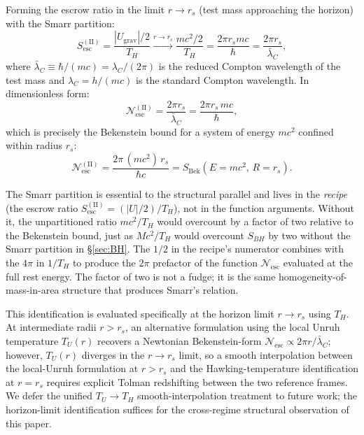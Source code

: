 \documentclass[11pt]{article}
\begin{document}
Forming the escrow ratio in the limit $r \to r_s$ (test mass approaching the horizon) with the Smarr partition:
\begin{equation}
S_{\mathrm{esc}}^{\mathrm{(II)}} = \frac{|U_{\mathrm{grav}}|/2}{T_H} \xrightarrow{r \to r_s} \frac{mc^2/2}{T_H} = \frac{2\pi r_s mc}{\hbar} = \frac{2\pi r_s}{\bar{\lambda}_C},
\label{eq:Sesc_II}
\end{equation}
where $\bar{\lambda}_C \equiv \hbar/(mc) = \lambda_C/(2\pi)$ is the reduced Compton wavelength of the test mass and $\lambda_C = h/(mc)$ is the standard Compton wavelength. In dimensionless form:
\begin{equation}
\mathcal{N}_{\mathrm{esc}}^{\mathrm{(II)}} = \frac{2\pi r_s}{\bar{\lambda}_C} = \frac{2\pi r_s \, mc}{\hbar},
\end{equation}
which is precisely the Bekenstein bound for a system of energy $mc^2$ confined within radius $r_s$:
\begin{equation}
\mathcal{N}_{\mathrm{esc}}^{\mathrm{(II)}} = \frac{2\pi \, (mc^2) \, r_s}{\hbar c} = S_{\mathrm{Bek}}(E=mc^2,\, R=r_s).
\end{equation}

\begin{remark}
The Smarr partition is essential to the structural parallel and lives in the \emph{recipe} (the escrow ratio $S_{\mathrm{esc}}^{(\mathrm{II})} = (|U|/2)/T_H$), not in the function arguments. Without it, the unpartitioned ratio $mc^2/T_H$ would overcount by a factor of two relative to the Bekenstein bound, just as $Mc^2/T_H$ would overcount $S_{BH}$ by two without the Smarr partition in \S\ref{sec:BH}. The $1/2$ in the recipe's numerator combines with the $4\pi$ in $1/T_H$ to produce the $2\pi$ prefactor of the function $\mathcal{N}_{\mathrm{esc}}$ evaluated at the full rest energy. The factor of two is not a fudge; it is the same homogeneity-of-mass-in-area structure that produces Smarr's relation.
\end{remark}

\begin{remark}
This identification is evaluated specifically at the horizon limit $r \to r_s$ using $T_H$. At intermediate radii $r > r_s$, an alternative formulation using the local Unruh temperature $T_U(r)$ recovers a Newtonian Bekenstein-form $\mathcal{N}_{\mathrm{esc}} \propto 2\pi r/\bar{\lambda}_C$; however, $T_U(r)$ diverges in the $r \to r_s$ limit, so a smooth interpolation between the local-Unruh formulation at $r > r_s$ and the Hawking-temperature identification at $r = r_s$ requires explicit Tolman redshifting \cite{Tolman1930} between the two reference frames. We defer the unified $T_U \to T_H$ smooth-interpolation treatment to future work; the horizon-limit identification suffices for the cross-regime structural observation of this paper.
\end{remark}
\end{document}
